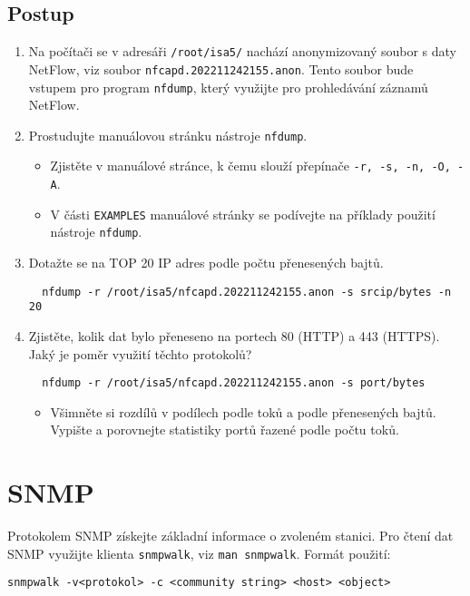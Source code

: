 \subsection*{Postup}
\begin{enumerate}
  \item Na počítači se v adresáři {\tt /root/isa5/} nachází anonymizovaný soubor s daty NetFlow, viz soubor \texttt{nfcapd.202211242155.anon}. Tento soubor bude vstupem pro program  {\tt nfdump}, který využijte pro prohledávání záznamů NetFlow.
  \item Prostudujte manuálovou stránku nástroje {\tt nfdump}.
    \begin{itemize}
      \item Zjistěte v manuálové stránce, k čemu slouží přepínače {\tt -r, -s, -n, -O, -A}.
      \item V části {\tt EXAMPLES} manuálové stránky se podívejte na příklady použití nástroje {\tt nfdump}.
    \end{itemize}
  \item Dotažte se na TOP 20 IP adres podle počtu přenesených bajtů. 
\begin{verbatim}
  nfdump -r /root/isa5/nfcapd.202211242155.anon -s srcip/bytes -n 20
\end{verbatim}
  \item Zjistěte, kolik dat bylo přeneseno na portech 80 (HTTP) a 443 (HTTPS). Jaký je poměr využití těchto protokolů?
\begin{verbatim}
  nfdump -r /root/isa5/nfcapd.202211242155.anon -s port/bytes 
\end{verbatim}
   \begin{itemize}
     \item Všimněte si rozdílů v podílech podle toků a podle přenesených bajtů. Vypište a porovnejte statistiky portů řazené podle počtu toků.
   \end{itemize}
\end{enumerate}

\section{SNMP}
Protokolem SNMP získejte základní informace o zvoleném stanici. Pro čtení dat SNMP využijte klienta \texttt{snmpwalk}, viz \texttt{man snmpwalk}. Formát použití:

\begin{verbatim}
snmpwalk -v<protokol> -c <community string> <host> <object>
\end{verbatim}


